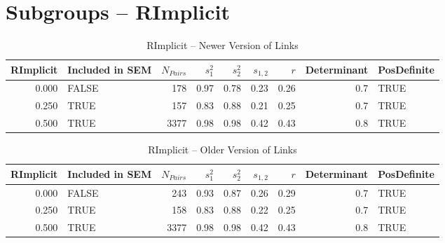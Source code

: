 \documentclass{article}\usepackage[]{graphicx}\usepackage[]{color}
\begin{document}
\section{Subgroups --  RImplicit }%
\begin{table}[ht]
\centering
\begin{tabular}{rlrrrrrrl}
  \hline
RImplicit & Included in SEM & $N_{Pairs}$ & $s_1^2$ & $s_2^2$ & $s_{1,2}$ & $r$ & Determinant & PosDefinite \\ 
  \hline
0.000 & FALSE & 178 & 0.97 & 0.78 & 0.23 & 0.26 & 0.7 & TRUE \\ 
  0.250 & TRUE & 157 & 0.83 & 0.88 & 0.21 & 0.25 & 0.7 & TRUE \\ 
  0.500 & TRUE & 3377 & 0.98 & 0.98 & 0.42 & 0.43 & 0.8 & TRUE \\ 
   \hline
\end{tabular}
\caption{RImplicit -- Newer Version of Links} 
\end{table}
\begin{table}[ht]
\centering
\begin{tabular}{rlrrrrrrl}
  \hline
RImplicit & Included in SEM & $N_{Pairs}$ & $s_1^2$ & $s_2^2$ & $s_{1,2}$ & $r$ & Determinant & PosDefinite \\ 
  \hline
0.000 & FALSE & 243 & 0.93 & 0.87 & 0.26 & 0.29 & 0.7 & TRUE \\ 
  0.250 & TRUE & 158 & 0.83 & 0.88 & 0.22 & 0.25 & 0.7 & TRUE \\ 
  0.500 & TRUE & 3377 & 0.98 & 0.98 & 0.42 & 0.43 & 0.8 & TRUE \\ 
   \hline
\end{tabular}
\caption{RImplicit -- Older Version of Links} 
\end{table}
\end{document}
